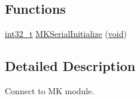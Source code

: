 \subsection*{Functions}
\begin{DoxyCompactItemize}
\item 
\hyperlink{group___n_a_m_e_gafd12020da5a235dfcf0c3c748fb5baed}{int32\-\_\-t} \hyperlink{group___m_k_serial_module_gacc59803463354177da71fc1b41753d90}{M\-K\-Serial\-Initialize} (\hyperlink{group___n_a_m_e_ga18028b8badbf1ea7e704ccac3c488e82}{void})
\end{DoxyCompactItemize}


\subsection{Detailed Description}
Connect to M\-K module. 

